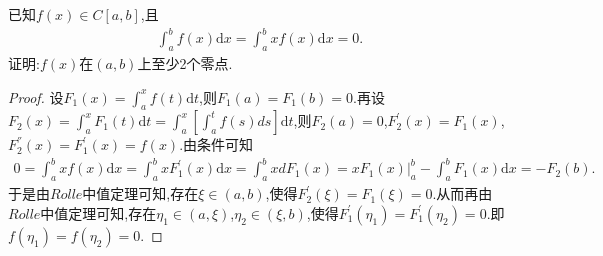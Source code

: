 \documentclass[../../main.tex]{subfiles}%
\begin{document}
\begin{example}
已知$f(x)\in C[a,b]$,且
\begin{align*}
\int_a^b{f\left( x \right) \mathrm{d}x}=\int_a^b{xf\left( x \right) \mathrm{d}x}=0.
\end{align*}
证明:$f(x)$在$(a,b)$上至少2个零点.
\end{example}
\begin{proof}

设\(F_1(x)=\int_a^x f(t)\mathrm{d}t\),则\(F_1(a)=F_1(b)=0\).再设\(F_2(x)=\int_a^x F_1(t)\mathrm{d}t=\int_a^x\left[\int_a^t f(s)ds\right]\mathrm{d}t\),则\(F_2(a)=0\),\(F_{2}^{\prime}(x)=F_1(x)\),\(F_{2}^{''}(x)=F_{1}^{\prime}(x)=f(x)\).由条件可知
\begin{align*}
0=\int_a^b xf(x)\mathrm{d}x
=\int_a^b xF_{1}^{\prime}(x)\mathrm{d}x
=\int_a^b xdF_1(x)
=xF_1(x)\Big|_{a}^{b}-\int_a^b F_1(x)\mathrm{d}x
=-F_2(b).
\end{align*}
于是由\(Rolle\)中值定理可知,存在\(\xi\in(a,b)\),使得\(F_{2}^{\prime}(\xi)=F_1(\xi)=0\).从而再由\(Rolle\)中值定理可知,存在\(\eta_1\in(a,\xi)\),\(\eta_2\in(\xi,b)\),使得\(F_{1}^{\prime}(\eta_1)=F_{1}^{\prime}(\eta_2)=0\).即\(f(\eta_1)=f(\eta_2)=0\).

\end{proof}
\end{document}
